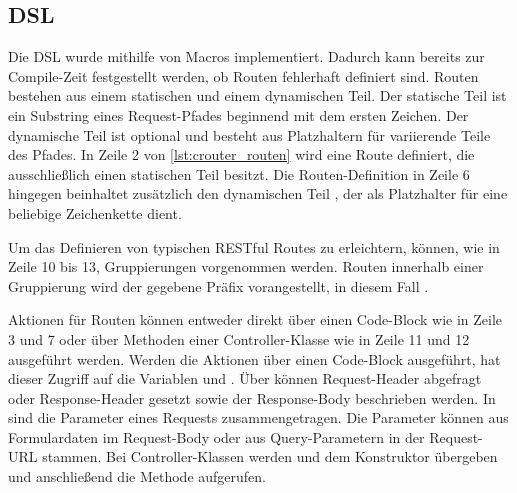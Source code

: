 \subsection{DSL}
\label{ssec:br_dsl}

Die DSL wurde mithilfe von Macros implementiert.  Dadurch kann bereits zur
Compile-Zeit festgestellt werden, ob Routen fehlerhaft definiert sind.  Routen
bestehen aus einem statischen und einem dynamischen Teil.  Der statische Teil
ist ein Substring eines Request-Pfades beginnend mit dem ersten Zeichen.  Der
dynamische Teil ist optional und besteht aus Platzhaltern für variierende Teile
des Pfades.  In Zeile 2 von \cref{lst:crouter_routen} wird eine Route
definiert, die ausschließlich einen statischen Teil besitzt.  Die
Routen-Definition in Zeile 6 hingegen beinhaltet zusätzlich den dynamischen
Teil , der als Platzhalter für eine beliebige Zeichenkette dient.

Um das Definieren von typischen RESTful Routes zu erleichtern, können, wie in
Zeile 10 bis 13, Gruppierungen vorgenommen werden.  Routen innerhalb einer
Gruppierung wird der gegebene Präfix vorangestellt, in diesem Fall
.

Aktionen für Routen können entweder direkt über einen Code-Block wie in Zeile 3
und 7 oder über Methoden einer Controller-Klasse wie in Zeile 11 und 12
ausgeführt werden.  Werden die Aktionen über einen Code-Block ausgeführt, hat
dieser Zugriff auf die Variablen  und .  Über
 können Request-Header abgefragt oder Response-Header gesetzt
sowie der Response-Body beschrieben werden.  In  sind die
Parameter eines Requests zusammengetragen.  Die Parameter können aus
Formulardaten im Request-Body oder aus Query-Parametern in der Request-URL
stammen.  Bei Controller-Klassen werden  und  dem
Konstruktor übergeben und anschließend die Methode aufgerufen.



